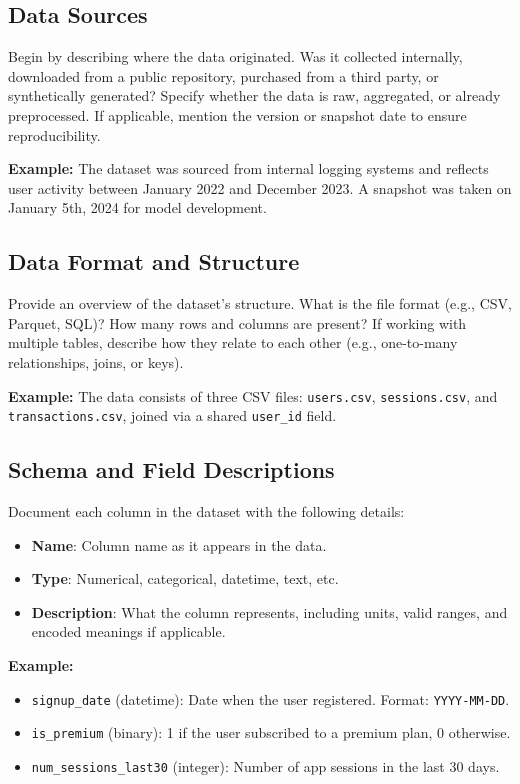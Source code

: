\documentclass[12pt,openany]{book}
\begin{document}
\subsection{Data Sources}

Begin by describing where the data originated. Was it collected internally, downloaded from a public repository, purchased from a third party, or synthetically generated? Specify whether the data is raw, aggregated, or already preprocessed. If applicable, mention the version or snapshot date to ensure reproducibility.

\textbf{Example:} The dataset was sourced from internal logging systems and reflects user activity between January 2022 and December 2023. A snapshot was taken on January 5th, 2024 for model development.

\subsection{Data Format and Structure}

Provide an overview of the dataset's structure. What is the file format (e.g., CSV, Parquet, SQL)? How many rows and columns are present? If working with multiple tables, describe how they relate to each other (e.g., one-to-many relationships, joins, or keys). 

\textbf{Example:} The data consists of three CSV files: \texttt{users.csv}, \texttt{sessions.csv}, and \texttt{transactions.csv}, joined via a shared \texttt{user\_id} field.

\subsection{Schema and Field Descriptions}

Document each column in the dataset with the following details:
\begin{itemize}
    \item \textbf{Name}: Column name as it appears in the data.
    \item \textbf{Type}: Numerical, categorical, datetime, text, etc.
    \item \textbf{Description}: What the column represents, including units, valid ranges, and encoded meanings if applicable.
\end{itemize}

\textbf{Example:}
\begin{itemize}
    \item \texttt{signup\_date} (datetime): Date when the user registered. Format: \texttt{YYYY-MM-DD}.
    \item \texttt{is\_premium} (binary): 1 if the user subscribed to a premium plan, 0 otherwise.
    \item \texttt{num\_sessions\_last30} (integer): Number of app sessions in the last 30 days.
\end{itemize}
\end{document}
